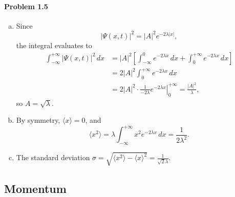 \documentclass{article}
\begin{document}
\paragraph{Problem 1.5}
\begin{enumerate}[(a)]
  \item Since \[ |\Psi(x, t)|^2 = |A|^2 e^{-2 \lambda |x|}, \] the integral
    evaluates to
    \begin{align*}
      \int_{-\infty}^{+\infty} |\Psi(x, t)|^2 \,dx
      &= |A|^2 \left[
        \int_{-\infty}^0 e^{-2 \lambda x} \,dx +
        \int_0^{+\infty} e^{-2 \lambda x} \,dx
      \right] \\
      &= 2|A|^2 \int_0^{+\infty} e^{-2 \lambda x} \,dx \\
      &= 2|A|^2 \cdot \left.
        \frac{1}{-2\lambda} e^{-2 \lambda x}
      \right|_0^{+\infty} = \frac{|A|^2}{\lambda},
    \end{align*}
    so $A = \sqrt{\lambda}$.
  \item By symmetry, $\langle x \rangle = 0$, and
    \begin{equation*}
      \langle x^2 \rangle
      = \lambda \int_{-\infty}^{+\infty} x^2 e^{-2 \lambda x} \,dx
      = \frac{1}{2\lambda^2}.
    \end{equation*}
  \item The standard deviation $\sigma = \sqrt{\langle x^2 \rangle -
    \langle x \rangle^2} = \frac{1}{\sqrt{2} \lambda}$.
\end{enumerate}

\subsection{Momentum}
\end{document}
